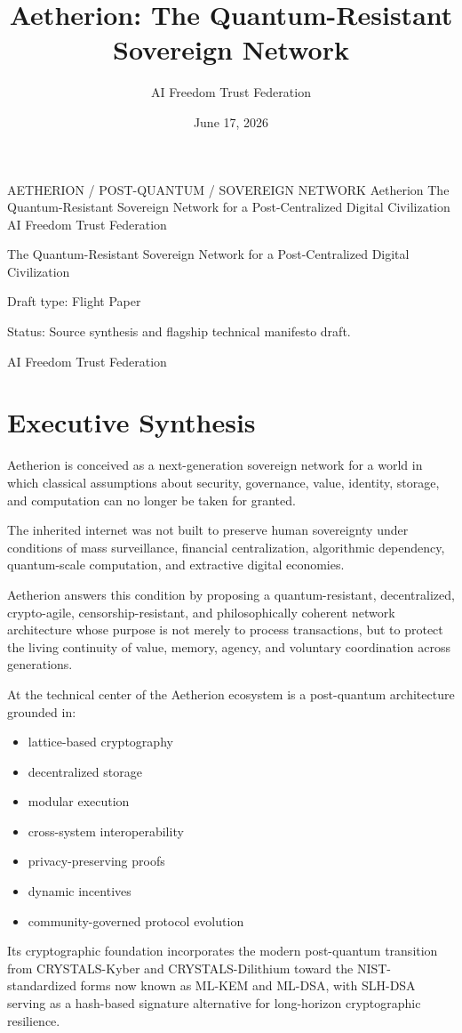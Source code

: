 ﻿\documentclass[12pt]{article}
\title{Aetherion: The Quantum-Resistant Sovereign Network}
\author{AI Freedom Trust Federation}
\date{June 17, 2026}
\begin{document}
\aftTitlePage
  {AETHERION / POST-QUANTUM / SOVEREIGN NETWORK}
  {Aetherion}
  {The Quantum-Resistant Sovereign Network for a Post-Centralized Digital Civilization}
  {AI Freedom Trust Federation}

\tableofcontents
\newpage


The Quantum-Resistant Sovereign Network for a Post-Centralized Digital Civilization

Draft type: Flight Paper

Status: Source synthesis and flagship technical manifesto draft.

AI Freedom Trust Federation

\section{Executive Synthesis}


Aetherion is conceived as a next-generation sovereign network for a world in which classical assumptions about security, governance, value, identity, storage, and computation can no longer be taken for granted.

The inherited internet was not built to preserve human sovereignty under conditions of mass surveillance, financial centralization, algorithmic dependency, quantum-scale computation, and extractive digital economies.

Aetherion answers this condition by proposing a quantum-resistant, decentralized, crypto-agile, censorship-resistant, and philosophically coherent network architecture whose purpose is not merely to process transactions, but to protect the living continuity of value, memory, agency, and voluntary coordination across generations.

At the technical center of the Aetherion ecosystem is a post-quantum architecture grounded in:

\begin{itemize}
  \item lattice-based cryptography
  \item decentralized storage
  \item modular execution
  \item cross-system interoperability
  \item privacy-preserving proofs
  \item dynamic incentives
  \item community-governed protocol evolution
\end{itemize}

Its cryptographic foundation incorporates the modern post-quantum transition from CRYSTALS-Kyber and CRYSTALS-Dilithium toward the NIST-standardized forms now known as ML-KEM and ML-DSA, with SLH-DSA serving as a hash-based signature alternative for long-horizon cryptographic resilience.
\end{document}
